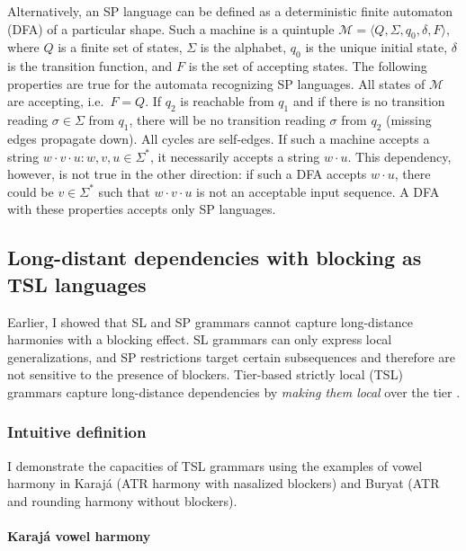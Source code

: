 Alternatively, an SP language can be defined as a deterministic finite automaton (DFA) of a particular shape.
Such a machine is a quintuple $\mathcal{M} = \langle Q, \Sigma, q_0, \delta, F\rangle$, where $Q$ is a finite set of states, $\Sigma$ is the alphabet, $q_0$ is the unique initial state, $\delta$ is the transition function, and $F$ is the set of accepting states.
The following properties are true for the automata recognizing SP languages.
All states of $\mathcal{M}$ are accepting, i.e.\ $F = Q$.
If $q_2$ is reachable from $q_1$ and if there is no transition reading $\sigma \in \Sigma$ from $q_1$, there will be no transition reading $\sigma$ from $q_2$ (missing edges propagate down).
All cycles are self-edges.
If such a machine accepts a string $w\cdot v\cdot u : w, v, u \in \Sigma^{*}$, it necessarily accepts a string $w\cdot u$.
This dependency, however, is not true in the other direction: if such a DFA accepts $w\cdot u$, there could be $v \in \Sigma^*$ such that $w\cdot v\cdot u$ is not an acceptable input sequence.
A DFA with these properties accepts only SP languages.







\subsection{Long-distant dependencies with blocking as TSL languages}
\label{tslsubsection}


Earlier, I showed that SL and SP grammars cannot capture long-distance harmonies with a blocking effect.
SL grammars can only express local generalizations, and SP restrictions target certain subsequences and therefore are not sensitive to the presence of blockers.
Tier-based strictly local (TSL) grammars capture long-distance dependencies by \emph{making them local} over the tier \citep{HeinzRawal11}.

\subsubsection{Intuitive definition}

I demonstrate the capacities of TSL grammars using the examples of vowel harmony in Karaj\'a (ATR harmony with nasalized blockers) and Buryat (ATR and rounding harmony without blockers).

\paragraph{Karaj\'a vowel harmony}

